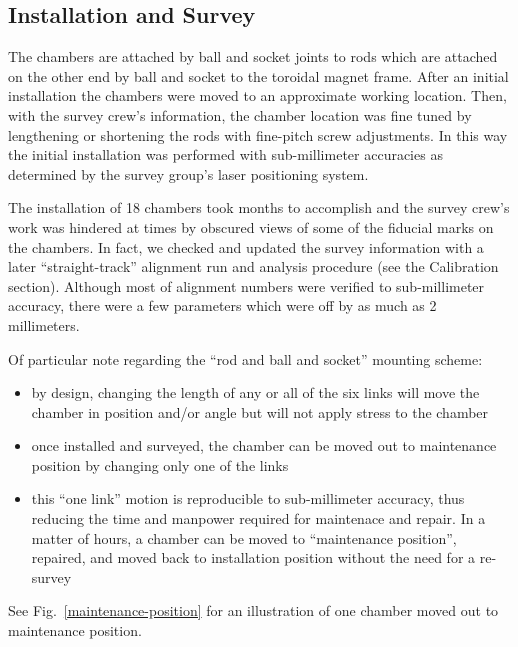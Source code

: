 \subsection{Installation and Survey}

The chambers are attached by ball and socket joints to rods which are attached
on the other end by ball and socket to the toroidal magnet frame.
After an initial installation the chambers were moved to an approximate
working location.  Then, with the survey crew's information, the chamber location
was fine tuned by lengthening or shortening the rods with fine-pitch screw adjustments.
In this way the initial installation was performed with sub-millimeter accuracies as
determined by the survey group's laser positioning system.

The installation of 18 chambers took months to accomplish and the survey crew's work
was hindered at times by obscured views of some of the fiducial marks on the 
chambers.  In fact, we checked and updated the survey information with a later 
``straight-track'' alignment run and analysis procedure (see the Calibration section).
Although most of alignment numbers were verified to sub-millimeter accuracy, there
were a few parameters which were off by as much as 2 millimeters.

Of particular note regarding the ``rod and ball and socket'' mounting scheme:
\begin{itemize}
\item by design, changing the length of any or all of the six links will
move the chamber in position and/or angle but will not apply stress to the
chamber
\item once installed and surveyed, the chamber can be moved out to maintenance
position by changing only one of the links
\item this ``one link'' motion is reproducible to sub-millimeter accuracy, thus reducing the time
and manpower required for maintenace and repair.  In a matter of hours, a chamber 
can be moved to ``maintenance position'', repaired, and moved back to installation
position without the need for a re-survey
\end{itemize}
See Fig.~\ref{maintenance-position} for an illustration of one chamber moved out to
maintenance position.

